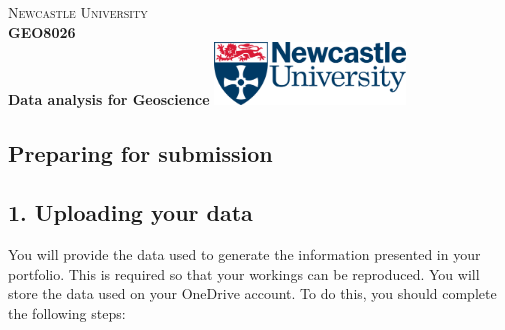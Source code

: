 \documentclass[11pt,onecolumn,a4paper,notitlepage]{article}
\begin{document}


\begin{tcolorbox}[ halign upper=flush center] %
	\large \textsc{Newcastle University}
	\vspace{0.25cm}
	\\
	{\huge {\textbf{GEO8026}}}
	\\
	\vspace{0.25cm}
	\textbf{Data analysis for Geoscience}
	\tcblower  %
	\includegraphics[width=2in]{logo.png}
\end{tcolorbox}

\noindent\makebox[\linewidth]{\rule{\textwidth}{0.4pt}} 


\begin{center}
\section*{Preparing for submission}
\end{center}

\subsection*{1.	Uploading your data}

\noindent You will provide the data used to generate the information presented in your portfolio. This is required so that your workings can be reproduced. You will store the data used on your OneDrive account. To do this, you should complete the following steps:
\bigskip
\end{document}
